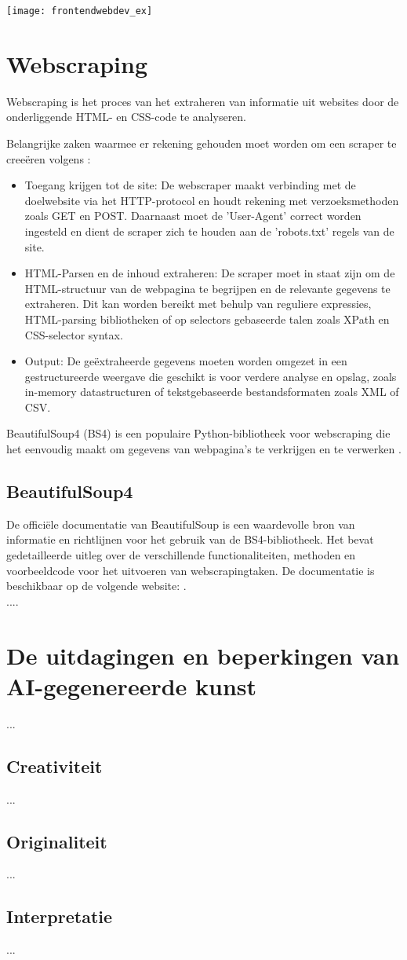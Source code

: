 \begin{center}
    \texttt{[image: frontendwebdev\_ex]}
    \label{fig:frontendwebdev_ex}
\end{center}


\section{Webscraping}
Webscraping is het proces van het extraheren van informatie uit websites door de onderliggende HTML- en CSS-code te analyseren.  

Belangrijke zaken waarmee er rekening gehouden moet worden om een scraper te creeëren volgens \autocite{BIO2014}:
\begin{itemize}
    \item Toegang krijgen tot de site: De webscraper maakt verbinding met de doelwebsite via het HTTP-protocol en houdt rekening met verzoeksmethoden zoals GET en POST. Daarnaast moet de 'User-Agent' correct worden ingesteld en dient de scraper zich te houden aan de 'robots.txt' regels van de site.
    \item HTML-Parsen en de inhoud extraheren: De scraper moet in staat zijn om de HTML-structuur van de webpagina te begrijpen en de relevante gegevens te extraheren. Dit kan worden bereikt met behulp van reguliere expressies, HTML-parsing bibliotheken of op selectors gebaseerde talen zoals XPath en CSS-selector syntax.
    \item Output: De geëxtraheerde gegevens moeten worden omgezet in een gestructureerde weergave die geschikt is voor verdere analyse en opslag, zoals in-memory datastructuren of tekstgebaseerde bestandsformaten zoals XML of CSV.
\end{itemize}

BeautifulSoup4 (BS4) is een populaire Python-bibliotheek voor webscraping die het eenvoudig maakt om gegevens van webpagina's te verkrijgen en te verwerken \autocite{BIO2014, BSFOR2015}. \\

\subsection{BeautifulSoup4}
De officiële documentatie van BeautifulSoup is een waardevolle bron van informatie en richtlijnen voor het gebruik van de BS4-bibliotheek. Het bevat gedetailleerde uitleg over de verschillende functionaliteiten, methoden en voorbeeldcode voor het uitvoeren van webscrapingtaken. De documentatie is beschikbaar op de volgende website: \autocite{BS4Documentation}. \\
....


\section{De uitdagingen en beperkingen van AI-gegenereerde kunst}
...
\subsection{Creativiteit}
...
\subsection{Originaliteit}
...
\subsection{Interpretatie}
...

